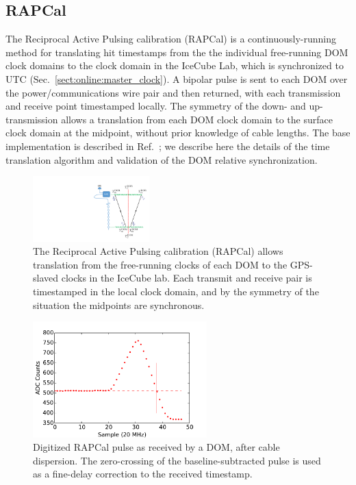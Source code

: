 \subsection{\label{sect:dom:rapcal}RAPCal}

The Reciprocal Active Pulsing calibration (RAPCal) is a
continuously-running method for translating hit timestamps from the the
individual free-running DOM clock domains to the clock domain in the
IceCube Lab, which is synchronized to UTC
(Sec.~\ref{sect:online:master_clock}).  A bipolar pulse is sent to each 
DOM over the power/communications wire pair and then returned, with each
transmission and receive point timestamped locally.  The symmetry of the down-
and up-transmission allows a translation from each DOM clock domain to the
surface clock domain at the midpoint, without prior knowledge of cable
lengths.  The base implementation is described in Ref.~\cite{ICECUBE:DAQ}; we
describe here the details of the time translation algorithm and validation
of the DOM relative synchronization. 

\begin{figure}[!h]
 \centering
 \includegraphics[width=0.4\textwidth]{graphics/dom/rapcal/rapcal_symmetry.pdf}
 \caption{The Reciprocal Active Pulsing calibration (RAPCal) allows
   translation from the free-running clocks of each DOM to the GPS-slaved
   clocks in the IceCube lab.  Each transmit and receive pair is
   timestamped in the local clock domain, and by the symmetry of the
   situation the midpoints are synchronous.}
 \label{fig:rapcal_symmetry}
\end{figure}

\begin{figure}[h]
 \centering
 \includegraphics[width=0.6\textwidth]{graphics/dom/rapcal/dom_wf_zero_crossing.pdf}
 \caption{Digitized RAPCal pulse as received by a DOM, after cable dispersion.  The
   zero-crossing of the baseline-subtracted pulse is used as a fine-delay
   correction to the received timestamp.}
 \label{fig:rapcal_zero_crossing}
\end{figure}

